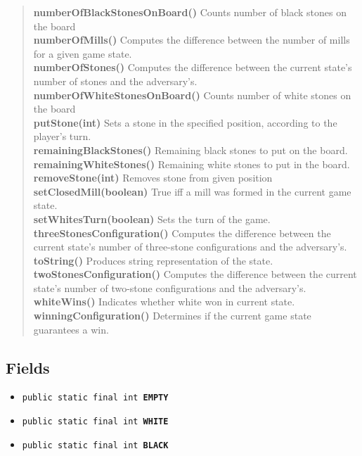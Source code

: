 \documentclass[11pt,a4paper]{report}
\begin{document}
{{{{{{{{{{{\begin{verse}
{\bf numberOfBlackStonesOnBoard()} Counts number of black stones on the board\\
{\bf numberOfMills()} Computes the difference between the number of mills for a given game state.\\
{\bf numberOfStones()} Computes the difference between the current state's number of stones and the adversary's.\\
{\bf numberOfWhiteStonesOnBoard()} Counts number of white stones on the board\\
{\bf putStone(int)} Sets a stone in the specified position, according to the player's turn.\\
{\bf remainingBlackStones()} Remaining black stones to put on the board.\\
{\bf remainingWhiteStones()} Remaining white stones to put in the board.\\
{\bf removeStone(int)} Removes stone from given position\\
{\bf setClosedMill(boolean)} True iff a mill was formed in the current game state.\\
{\bf setWhitesTurn(boolean)} Sets the turn of the game.\\
{\bf threeStonesConfiguration()} Computes the difference between the current state's number of three-stone configurations and the adversary's.\\
{\bf toString()} Produces string representation of the state.\\
{\bf twoStonesConfiguration()} Computes the difference between the current state's number of two-stone configurations and the adversary's.\\
{\bf whiteWins()} Indicates whether white won in current state.\\
{\bf winningConfiguration()} Determines if the current game state guarantees a win.\\
\end{verse}
}
\subsection{Fields}{
\begin{itemize}
\item{
\label{model.LaskerMorrisGameState.EMPTY}\texttt{public static final int\ {\bf  EMPTY}}
}
\item{
\label{model.LaskerMorrisGameState.WHITE}\texttt{public static final int\ {\bf  WHITE}}
}
\item{
\label{model.LaskerMorrisGameState.BLACK}\texttt{public static final int\ {\bf  BLACK}}
}
\end{itemize}
}
}}}}}}}}}}
\end{document}
